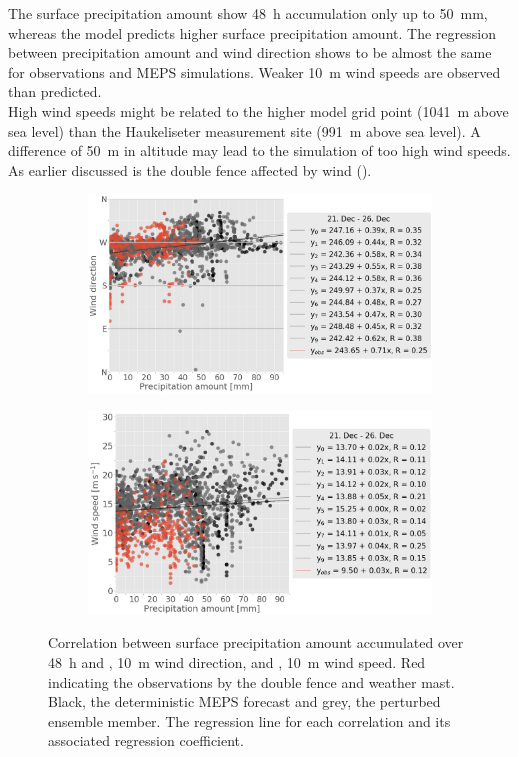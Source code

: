 The surface precipitation amount show \SI{48}{\hour} accumulation only up to \SI{50}{\mm}, whereas the model predicts higher surface precipitation amount. The regression between precipitation amount and wind direction shows to be almost the same for observations and MEPS simulations. Weaker \SI{10}{\metre} wind speeds are observed than predicted. 
\\
High wind speeds might be related to the higher model grid point (\SI{1041}{\metre} above sea level) than the Haukeliseter measurement site (\SI{991}{\metre} above sea level). A difference of \SI{50}{\metre} in altitude may lead to the simulation of too high wind speeds. As earlier discussed is the double fence affected by wind (). 
\begin{figure}
	\centering
	\begin{subfigure}[b]{0.8\textwidth}
		\centering
		\includegraphics[width=\textwidth]{./fig_scat_PP/precip_vs_WD}
		\caption{}\label{fig:wind_precip:WD}
	\end{subfigure}
	\begin{subfigure}[b]{0.8\textwidth}
		\centering
		\includegraphics[width=\textwidth]{./fig_scat_PP/precip_vs_WS}
		\caption{}\label{fig:wind_precip:WS}
	\end{subfigure}
	\caption{Correlation between surface precipitation amount accumulated over \SI{48}{\hour} and \protect{}, \SI{10}{\meter} wind direction, and \protect{}, \SI{10}{\metre} wind speed. Red indicating the observations by the double fence and weather mast. Black, the deterministic MEPS forecast and grey, the perturbed ensemble member. The regression line for each correlation and its associated regression coefficient.}\label{fig:wind_precip}
\end{figure}
